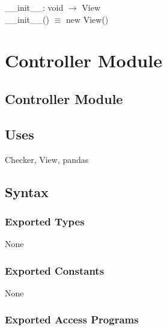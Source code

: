 \documentclass[12pt]{article}
\begin{document}
\_\_init\_\_: void $\rightarrow$ View \\
\_\_init\_\_() $\equiv$ new View()

\newpage

\section* {Controller Module}

\subsection* {Controller Module}

\subsection* {Uses}

Checker, View, pandas

\subsection* {Syntax}

\subsubsection* {Exported Types}

None

\subsubsection* {Exported Constants}

None

\subsubsection* {Exported Access Programs}
\end{document}
